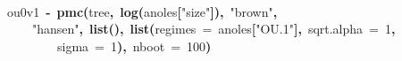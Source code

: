 \documentclass{elsarticle}
\makeatletter
\newcommand{\hlnumber}[1]{\textcolor[rgb]{0,0,0}{#1}}%
\newcommand{\hlfunctioncall}[1]{\textcolor[rgb]{.5,0,.33}{\textbf{#1}}}%
\newcommand{\hlstring}[1]{\textcolor[rgb]{.6,.6,1}{#1}}%
\newcommand{\hlkeyword}[1]{\textbf{#1}}%
\newcommand{\hlargument}[1]{\textcolor[rgb]{.69,.25,.02}{#1}}%
\newcommand{\hlassignement}[1]{\textbf{#1}}%
\newcommand{\hlsymbol}[1]{#1}%
\newcommand{\hlstd}[1]{\textcolor[rgb]{0,0,0}{#1}}%
\newenvironment{kframe}{%
 \def\FrameCommand##1{\hskip\@totalleftmargin \hskip-\fboxsep
 \colorbox{shadecolor}{##1}\hskip-\fboxsep
     \hskip-\linewidth \hskip-\@totalleftmargin \hskip\columnwidth}%
 \MakeFramed {\advance\hsize-\width
   \@totalleftmargin\z@ \linewidth\hsize
   \@setminipage}}%
 {\par\unskip\endMakeFramed}
\newenvironment{knitrout}{}{} %
\makeatother
\begin{document}
\begin{knitrout}
{\begin{kframe}
\begin{flushleft}
\hlstd{}\hspace*{\fill}\\
\hlstd{}\hlsymbol{ou0v1}{\ }\hlassignement{\usebox{\hlnormalsizeboxlessthan}-}{\ }\hlfunctioncall{pmc}\hlkeyword{(}\hlsymbol{tree}\hlkeyword{,}{\ }\hlfunctioncall{log}\hlkeyword{(}\hlsymbol{anoles}\hlkeyword{[}\hlstring{"{}size"{}}\hlkeyword{]}\hlkeyword{)}\hlkeyword{,}{\ }\hlstring{"{}brown"{}}\hlkeyword{,}\hspace*{\fill}\\
\hlstd{}{\ }{\ }{\ }{\ }\hlstring{"{}hansen"{}}\hlkeyword{,}{\ }\hlfunctioncall{list}\hlkeyword{(}\hlkeyword{)}\hlkeyword{,}{\ }\hlfunctioncall{list}\hlkeyword{(}\hlargument{regimes}{\ }\hlargument{=}{\ }\hlsymbol{anoles}\hlkeyword{[}\hlstring{"{}OU.1"{}}\hlkeyword{]}\hlkeyword{,}{\ }\hlargument{sqrt.alpha}{\ }\hlargument{=}{\ }\hlnumber{1}\hlkeyword{,}\hspace*{\fill}\\
\hlstd{}{\ }{\ }{\ }{\ }{\ }{\ }{\ }{\ }\hlargument{sigma}{\ }\hlargument{=}{\ }\hlnumber{1}\hlkeyword{)}\hlkeyword{,}{\ }\hlargument{nboot}{\ }\hlargument{=}{\ }\hlnumber{100}\hlkeyword{)}\mbox{}
\normalfont
\end{flushleft}
\end{kframe}}
\end{knitrout}
\end{document}

